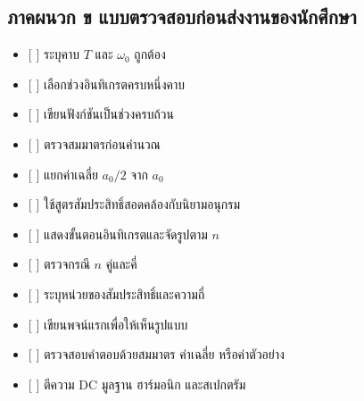 
\subsection{ภาคผนวก ข แบบตรวจสอบก่อนส่งงานของนักศึกษา}

\begin{itemize}
\item
  {[} {]} ระบุคาบ \(T\) และ \(\omega_0\) ถูกต้อง
\item
  {[} {]} เลือกช่วงอินทิเกรตครบหนึ่งคาบ
\item
  {[} {]} เขียนฟังก์ชันเป็นช่วงครบถ้วน
\item
  {[} {]} ตรวจสมมาตรก่อนคำนวณ
\item
  {[} {]} แยกค่าเฉลี่ย \(a_0/2\) จาก \(a_0\)
\item
  {[} {]} ใช้สูตรสัมประสิทธิ์สอดคล้องกับนิยามอนุกรม
\item
  {[} {]} แสดงขั้นตอนอินทิเกรตและจัดรูปตาม \(n\)
\item
  {[} {]} ตรวจกรณี \(n\) คู่และคี่
\item
  {[} {]} ระบุหน่วยของสัมประสิทธิ์และความถี่
\item
  {[} {]} เขียนพจน์แรกเพื่อให้เห็นรูปแบบ
\item
  {[} {]} ตรวจสอบคำตอบด้วยสมมาตร ค่าเฉลี่ย หรือค่าตัวอย่าง
\item
  {[} {]} ตีความ DC มูลฐาน ฮาร์มอนิก และสเปกตรัม
\end{itemize}
